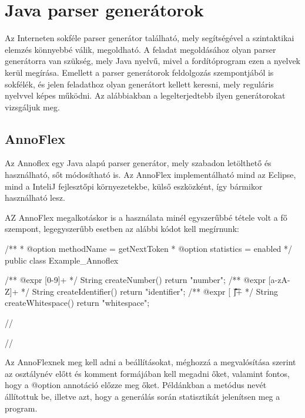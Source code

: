 


\section{Java parser generátorok}

Az Interneten sokféle parser generátor található, mely segítségével a szintaktikai elemzés könnyebbé válik, megoldható.
A feladat megoldásához olyan parser generátorra van szükség, mely Java nyelvű, mivel a fordítóprogram ezen a nyelvek kerül megírása.
Emellett a parser generátorok feldolgozás szempontjából is sokfélék, és jelen feladathoz olyan generátort kellett keresni, mely reguláris nyelvvel képes működni.
Az alábbiakban a legelterjedtebb ilyen generátorokat vizsgáljuk meg.

\subsection{AnnoFlex}

Az Annoflex egy Java alapú parser generátor, mely szabadon letölthető és használható, sőt módosítható is. Az AnnoFlex implementálható mind az Eclipse, mind a InteliJ fejlesztőpi környezetekbe, külső eszközként, így bármikor használható lesz.

AZ AnnoFlex megalkotáskor is a használata minél egyszerűbbé tétele volt a fő szempont, legegyszerűbb esetben az alábbi kódot kell megírnunk:

\begin{java}
/**
* @option methodName = getNextToken
* @option statistics = enabled
*/
public class Example_Annoflex {
/** @expr [0-9]+       */ String createNumber()     { return "number"; }
/** @expr [a-zA-Z]+    */ String createIdentifier() { return "identifier"; }
/** @expr [ \n\r\t\f]+ */ String createWhitespace() { return "whitespace"; }

//%


//%
}
\end{java}

Az AnnoFlexnek meg kell adni a beállításokat, méghozzá a megvalósítása szerint az osztálynév előtt és komment formájában kell megadni őket, valamint fontos, hogy a @option annotáció előzze meg őket. Példánkban a metódus nevét állítottuk be, illetve azt, hogy a generálás során statisztikát jelenítsen meg a program.

